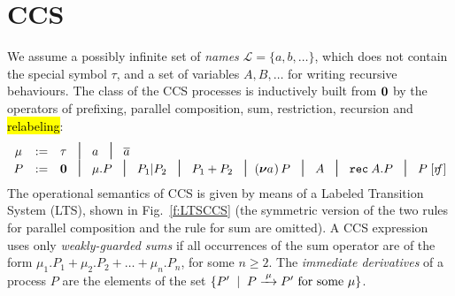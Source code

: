 
\section{CCS}
\label{ss:ccs}


We assume  a possibly infinite set of \emph{names} $\mathscr{L} = \{a, b,
\ldots\}$, which does not contain the special symbol $\tau$, and
a set of variables $A,B, \ldots$ for writing recursive behaviours. 
The class  of the CCS processes is inductively built from ${\boldsymbol 0}$ by the operators
of  prefixing, parallel composition,  sum, restriction, recursion and \hl{relabeling}:
\begin{equation*}
\begin{array}{ccl}
\mu  & := &  \tau \hspace{.3pt} \; \midd \; a  \; \midd \;  \outC a  \\
P  & := &  \nil \; \midd \;  \mu . P \; \midd \;  P_1 |  P_2 \; \midd  \;
P_1 + P_2 \; \midd %
  (\res a\!)\, P  \;  \midd \;  A \; \midd \; \recu A  P
\; \midd \; P\; [r\!\!f]  %
\end{array}
\end{equation*}
The operational semantics of CCS is given by means of
a Labeled Transition System (LTS), shown in Fig.~\ref{f:LTSCCS} (the symmetric version of the two rules for
parallel composition and the rule for sum are omitted).
A CCS expression uses only \emph{weakly-guarded sums} if all occurrences of
the sum operator are of the form $\mu_1.P_1 + \mu_2.P_2 + \ldots
+ \mu_n.P_n$, for some $n \geq 2$.
 The \emph{immediate derivatives} of a
process $P$ are the elements of the set $\{P' \st P \arr\mu P' \mbox{
  for some $\mu$}\}$.

